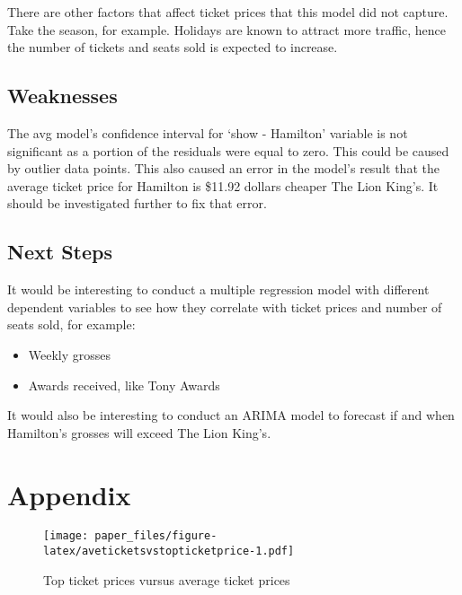 \documentclass[
]{article}
\begin{document}
There are other factors that affect ticket prices that this model did not capture. Take the season, for example. Holidays are known to attract more traffic, hence the number of tickets and seats sold is expected to increase.

\hypertarget{weaknesses}{%
\subsection{Weaknesses}\label{weaknesses}}

The avg model's confidence interval for `show - Hamilton' variable is not significant as a portion of the residuals were equal to zero. This could be caused by outlier data points. This also caused an error in the model's result that the average ticket price for Hamilton is \$11.92 dollars cheaper The Lion King's. It should be investigated further to fix that error.

\hypertarget{next-steps}{%
\subsection{Next Steps}\label{next-steps}}

It would be interesting to conduct a multiple regression model with different dependent variables to see how they correlate with ticket prices and number of seats sold, for example:

\begin{itemize}
\item
  Weekly grosses
\item
  Awards received, like Tony Awards
\end{itemize}

It would also be interesting to conduct an ARIMA model to forecast if and when Hamilton's grosses will exceed The Lion King's.

\newpage

\appendix

\hypertarget{appendix}{%
\section*{Appendix}\label{appendix}}

\begin{figure}
\centering
\texttt{[image: paper\_files/figure-latex/aveticketsvstopticketprice-1.pdf]}
\caption{\label{fig:aveticketsvstopticketprice}Top ticket prices vursus average ticket prices}
\end{figure}
\end{document}
